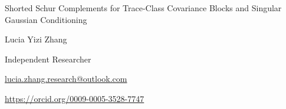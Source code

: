 \documentclass[12pt]{article}
\begin{document}
\thispagestyle{empty}

\begin{center}
{\Large Shorted Schur Complements for Trace-Class Covariance Blocks and Singular Gaussian Conditioning\par}

\vspace{1.5cm}

{\large Lucia Yizi Zhang\par}

\vspace{0.5cm}

Independent Researcher\par
\href{mailto:lucia.zhang.research@outlook.com}{lucia.zhang.research@outlook.com}\par
\href{https://orcid.org/0009-0005-3528-7747}{https://orcid.org/0009-0005-3528-7747}
\end{center}
\end{document}
